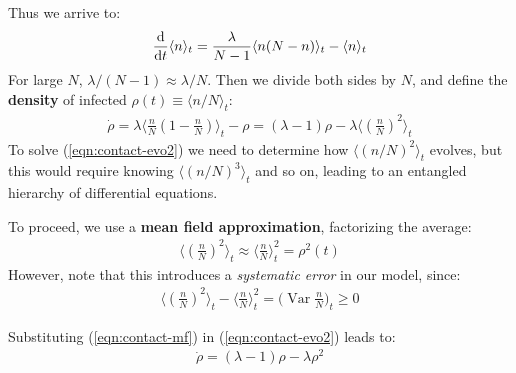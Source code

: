 \documentclass[../../main.tex]{subfiles}
\begin{document}
Thus we arrive to:
\begin{align}\label{eqn:contact-evo1}
    \dv{t} \langle n \rangle_t = \frac{\lambda}{N-1} \langle n(N-n) \rangle_t - \langle n \rangle_t
\end{align}
For large $N$, $\lambda/(N-1) \approx \lambda/N$. Then we divide both sides by $N$, and define the \textbf{density} of infected $\rho(t) \equiv \langle n/N \rangle_t$:
\begin{align}\label{eqn:contact-evo2}
    \dot{\rho} = \lambda \langle \frac{n}{N} \left(1- \frac{n}{N} \right)  \rangle_t - \rho = (\lambda - 1)\rho - \lambda \langle \left(\frac{n}{N} \right)^2 \rangle_t
\end{align}
To solve (\ref{eqn:contact-evo2}) we need to determine how $\langle (n/N)^2 \rangle_t$ evolves, but this would require knowing $\langle (n/N)^3 \rangle_t$ and so on, leading to an entangled hierarchy of differential equations.

\medskip

To proceed, we use a \textbf{mean field approximation}, factorizing the average:
\begin{align}\label{eqn:contact-mf}
    \langle \left(\frac{n}{N} \right)^2 \rangle_t \approx \langle \frac{n}{N}  \rangle^2_t = \rho^2(t)
\end{align} 
However, note that this introduces a \textit{systematic error} in our model, since:
\begin{align}\label{eqn:var-term}
    \langle \left(\frac{n}{N} \right)^2 \rangle_t - \langle \frac{n}{N}  \rangle^2_t = \Big(\operatorname{Var} \frac{n}{N} \Big)_t \geq 0
\end{align} 

Substituting (\ref{eqn:contact-mf}) in (\ref{eqn:contact-evo2}) leads to:
\begin{align}\label{eqn:contact-evo3}
    \dot{\rho} = (\lambda - 1) \rho - \lambda \rho^2
\end{align}
\end{document}
